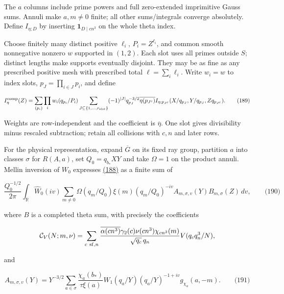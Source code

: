 The \(a\) columns include prime powers and full zero-extended imprimitive Gauss sums. Annuli make \(a,m\ne0\) finite; all other sums/integrals converge absolutely. Define \(I_{\eta;D}\) by inserting \(\mathbf1_{D\mid cn^3}\) on the whole theta index.

Choose finitely many distinct positive \(\ell_i\), \(P_i=Z^{\ell_i}\), and common smooth nonnegative nonzero \(w\) supported in \((1,2)\). Each slot uses all primes outside \(S\); distinct lengths make supports eventually disjoint. They may be as fine as any prescribed positive mesh with prescribed total \(\ell=\sum_i\ell_i\). Write \(w_i=w\) to index slots, \(p_J=\prod_{i\in J}p_i\), and define

\hypertarget{dr:comp}{}

\label{dr:comp}

\[
I_\eta^{\rm comp}(Z)=
 \sum_{(p_i)}\prod_iw_i(q_{p_i}/P_i)
 \sum_{J\subseteq\{1,\ldots,r_{\rm slot}\}}
 (-1)^{|J|}q_{p_J}^{-3/2}\overline{\eta(p_{J^c})}
 I_{\eta;p_{J^c}}(X/q_{p_J},Y/q_{p_J},Zq_{p_{J^c}}).
 \qquad\text{(189)}
\]

Weights are row-independent and the coefficient is \(\overline\eta\). One slot gives divisibility minus rescaled subtraction; retain all collisions with \(c,n\) and later rows.

For the physical representation, expand \(\overline G\) on its fixed ray group, partition \(a\) into classes \(\sigma\) for \(R(A,a)\), set \(Q_0=q_{b_*}XY\) and take \(\Omega=1\) on the product annuli. Mellin inversion of \(W_0\) expresses \protect\hyperlink{dr:I}{(188)} as a finite sum of

\hypertarget{dr:physical}{}

\label{dr:physical}

\[
\frac{Q_0^{-1/2}}{2\pi}\int_{\mathbb R}\widehat W_0(iv)
 \sum_{m\ne0}\Omega(q_m/Q_0)\xi(m)(q_m/Q_0)^{-iv}
 A_{m,\sigma,v}(Y)B_{m,\sigma}(Z)\,dv,
 \qquad\text{(190)}
\]

where \(B\) is a completed theta sum, with precisely the coefficients

\[
\mathcal C_V(N;m,\nu)=\sum_{c\ {\rm sf},n}
 \frac{\overline{\alpha(cn^3)}\gamma_2(c)\nu(cn^3)\chi_{cn^3}(m)}
 {\sqrt{q_c}\,q_n}V(q_cq_n^3/N),
\]

and

\hypertarget{dr:A}{}

\label{dr:A}

\[
A_{m,\sigma,v}(Y)=Y^{-3/2}\sum_{a\in\sigma}
 \frac{\chi_a(b_*)}{\tau\xi(a)}W_1(q_a/Y)
 (q_a/Y)^{-1+iv}g_{\chi_a}(a,-m).
 \qquad\text{(191)}
\]


